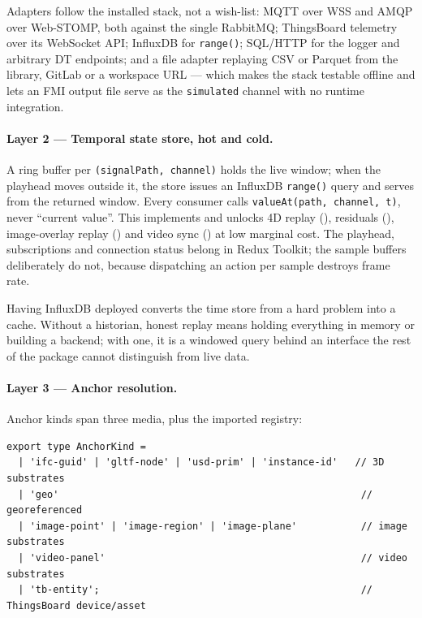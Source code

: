 Adapters follow the installed stack, not a wish-list: MQTT over WSS and AMQP over
Web-STOMP, both against the single RabbitMQ; ThingsBoard telemetry over its WebSocket
API; InfluxDB for \texttt{range()}; SQL/HTTP for the logger and arbitrary DT endpoints;
and a file adapter replaying CSV or Parquet from the library, GitLab or a workspace
URL --- which makes the stack testable offline and lets an FMI output file serve as the
\texttt{simulated} channel with no runtime integration.

\paragraph{Layer 2 --- Temporal state store, hot and cold.} A ring buffer per
\texttt{(signalPath, channel)} holds the live window; when the playhead moves outside
it, the store issues an InfluxDB \texttt{range()} query and serves from the returned
window. Every consumer calls \texttt{valueAt(path, channel, t)}, never ``current
value''. This implements  and unlocks 4D replay (), residuals (),
image-overlay replay () and video sync () at low marginal cost. The
playhead, subscriptions and connection status belong in Redux Toolkit; the sample
buffers deliberately do not, because dispatching an action per sample destroys frame
rate.

\begin{keypoint}
Having InfluxDB deployed converts the time store from a hard problem into a cache.
Without a historian, honest replay means holding everything in memory or building a
backend; with one, it is a windowed query behind an interface the rest of the package
cannot distinguish from live data.
\end{keypoint}

\paragraph{Layer 3 --- Anchor resolution.} Anchor kinds span three media, plus the
imported registry:

\begin{lstlisting}
export type AnchorKind =
  | 'ifc-guid' | 'gltf-node' | 'usd-prim' | 'instance-id'   // 3D substrates
  | 'geo'                                                    // georeferenced
  | 'image-point' | 'image-region' | 'image-plane'           // image substrates
  | 'video-panel'                                            // video substrates
  | 'tb-entity';                                             // ThingsBoard device/asset
\end{lstlisting}

